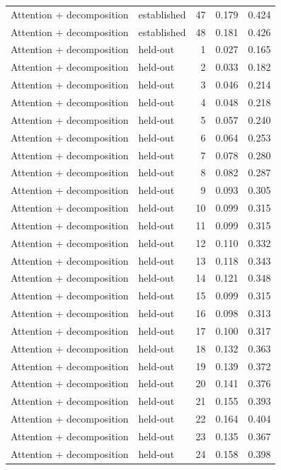 \begin{tabular}{llrrr}
Attention + decomposition & established & 47 & 0.179 & 0.424 \\
Attention + decomposition & established & 48 & 0.181 & 0.426 \\
Attention + decomposition & held-out & 1 & 0.027 & 0.165 \\
Attention + decomposition & held-out & 2 & 0.033 & 0.182 \\
Attention + decomposition & held-out & 3 & 0.046 & 0.214 \\
Attention + decomposition & held-out & 4 & 0.048 & 0.218 \\
Attention + decomposition & held-out & 5 & 0.057 & 0.240 \\
Attention + decomposition & held-out & 6 & 0.064 & 0.253 \\
Attention + decomposition & held-out & 7 & 0.078 & 0.280 \\
Attention + decomposition & held-out & 8 & 0.082 & 0.287 \\
Attention + decomposition & held-out & 9 & 0.093 & 0.305 \\
Attention + decomposition & held-out & 10 & 0.099 & 0.315 \\
Attention + decomposition & held-out & 11 & 0.099 & 0.315 \\
Attention + decomposition & held-out & 12 & 0.110 & 0.332 \\
Attention + decomposition & held-out & 13 & 0.118 & 0.343 \\
Attention + decomposition & held-out & 14 & 0.121 & 0.348 \\
Attention + decomposition & held-out & 15 & 0.099 & 0.315 \\
Attention + decomposition & held-out & 16 & 0.098 & 0.313 \\
Attention + decomposition & held-out & 17 & 0.100 & 0.317 \\
Attention + decomposition & held-out & 18 & 0.132 & 0.363 \\
Attention + decomposition & held-out & 19 & 0.139 & 0.372 \\
Attention + decomposition & held-out & 20 & 0.141 & 0.376 \\
Attention + decomposition & held-out & 21 & 0.155 & 0.393 \\
Attention + decomposition & held-out & 22 & 0.164 & 0.404 \\
Attention + decomposition & held-out & 23 & 0.135 & 0.367 \\
Attention + decomposition & held-out & 24 & 0.158 & 0.398 \\

\end{tabular}
